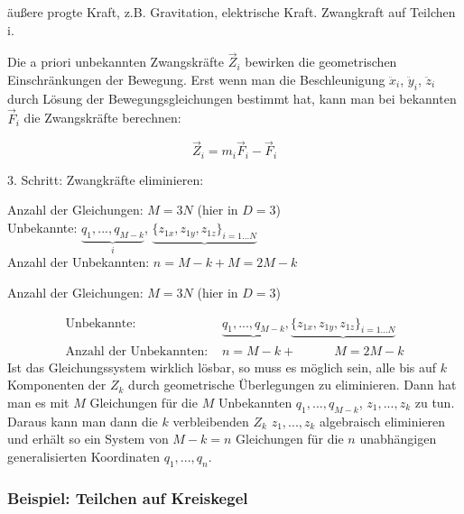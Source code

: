 \documentclass[10pt, letterpaper]{article}
\begin{document}
äußere progte Kraft, z.B. Gravitation, elektrische Kraft. \quad Zwangkraft auf Teilchen i.

Die a priori unbekannten Zwangskräfte $\vec{Z}_i$ bewirken die geometrischen Einschränkungen der Bewegung. Erst wenn man die Beschleunigung $\ddot{x}_i$, $\ddot{y}_i$, $\ddot{z}_i$ durch Lösung der Bewegungsgleichungen bestimmt hat, kann man bei bekannten $\vec{F}_i$ die Zwangskräfte berechnen:

\[\vec{Z}_i = m_i\vec{F}_i - \vec{F}_i\]



3. Schritt: Zwangkräfte eliminieren:

Anzahl der Gleichungen: $M = 3N$ (hier in $D=3$)\\
Unbekannte: $\underbrace{q_1,...,q_{M-k}}_{i}$, $\underbrace{\{z_{1x},z_{1y},z_{1z}\}_{i=1...N}}$\\
Anzahl der Unbekannten: $n=M-k + M = 2M-k$

Anzahl der Gleichungen: $M = 3N$ (hier in $D=3$)

$$
\begin{aligned}
\text{Unbekannte: } & \underbrace{q_1,...,q_{M-k}}_{}, \underbrace{\{z_{1x},z_{1y},z_{1z}\}_{i=1...N}}\\
\text{Anzahl der Unbekannten: } & n=M-k +\qquad \quad M = 2M-k
\end{aligned}
$$
Ist das Gleichungssystem wirklich lösbar, so muss es möglich sein, alle bis auf $k$ Komponenten der $Z_k$ durch geometrische Überlegungen zu eliminieren. Dann hat man es mit $M$ Gleichungen für die $M$ Unbekannten $q_1,...,q_{M-k}$, $z_1,...,z_k$ zu tun. Daraus kann man dann die $k$ verbleibenden $Z_k$ $z_1,...,z_k$ algebraisch eliminieren und erhält so ein System von $M-k=n$ Gleichungen für die $n$ unabhängigen generalisierten Koordinaten $q_1,...,q_n$.



\subsubsection{Beispiel: Teilchen auf Kreiskegel}

\begin{center}
\end{center}
\end{document}
